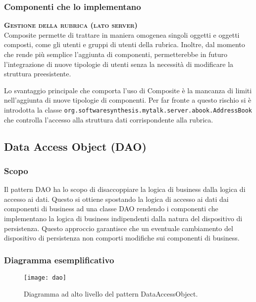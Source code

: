 \subsubsection{Componenti che lo implementano}
\begin{description}
\item{\bfseries\scshape Gestione della rubrica (lato server)}\\
Composite permette di trattare in maniera omogenea singoli oggetti e oggetti composti, come gli utenti e gruppi di utenti della rubrica. Inoltre, dal momento che rende più semplice l'aggiunta di componenti, permetterebbe in futuro l'integrazione di nuove tipologie di utenti senza la necessità di modificare la struttura preesistente.

Lo svantaggio principale che comporta l'uso di Composite è la mancanza di limiti nell'aggiunta di nuove tipologie di componenti. Per far fronte a questo rischio si è introdotta la classe \texttt{org.softwaresynthesis.mytalk.server.abook.AddressBook} che controlla l'accesso alla struttura dati corrispondente alla rubrica.
\end{description}

\subsection{Data Access Object (DAO)}

\subsubsection{Scopo}
Il pattern DAO ha lo scopo di disaccoppiare la logica di business dalla logica di accesso ai dati. Questo si ottiene spostando la logica di accesso ai dati dai componenti di business ad una classe DAO rendendo i componenti che implementano la logica di business indipendenti dalla natura del dispositivo di persistenza. Questo approccio garantisce che un eventuale cambiamento del dispositivo di persistenza non comporti modifiche sui componenti di business.

\subsubsection{Diagramma esemplificativo}
\begin{figure}[h]
\centering
\texttt{[image: dao]}
\caption{Diagramma ad alto livello del pattern DataAccessObject.}\label{fig:dao}
\end{figure}

